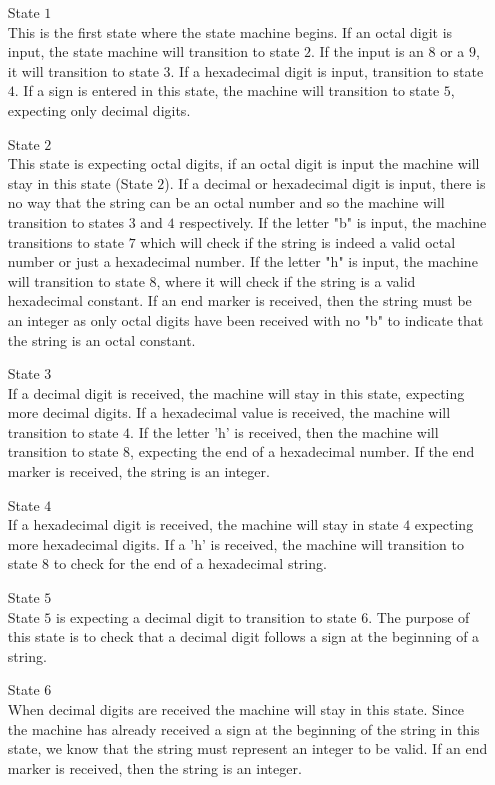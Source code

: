 \documentclass[11pt]{article}
\begin{document}
\begin{itemize}
\item[State $1$] \hfill \\
This is the first state where the state machine begins. If an octal digit is input, the state machine will transition to state $2$. If the input is an $8$ or a $9$, it will transition to state $3$. If a hexadecimal digit is input, transition to state $4$. If a sign is entered in this state, the machine will transition to state $5$, expecting only decimal digits.
\item[State $2$] \hfill \\
This state is expecting octal digits, if an octal digit is input the machine will stay in this state (State $2$).
 If a decimal or hexadecimal digit is input, there is no way that the string can be an octal number and so the machine will transition to states $3$ and $4$ respectively. 
 If the letter "b" is input, the machine transitions to state $7$ which will check if the string is indeed a valid octal number or just a hexadecimal number. 
 If the letter "h" is input, the machine will transition to state $8$, where it will check if the string is a valid hexadecimal constant. 
 If an end marker is received, then the string must be an integer as only octal digits have been received with no "b" to indicate that the string is an octal constant.
\item[State $3$] \hfill \\
If a decimal digit is received, the machine will stay in this state, expecting more decimal digits. If a hexadecimal value is received, the machine will transition to state $4$. If the letter 'h' is received, then the machine will transition to state $8$, expecting the end of a hexadecimal number. If the end marker is received, the string is an integer.
\item[State $4$] \hfill \\
If a hexadecimal digit is received, the machine will stay in state $4$ expecting more hexadecimal digits. If a 'h' is received, the machine will transition to state $8$ to check for the end of a hexadecimal string. 
\item[State $5$] \hfill \\
State $5$ is expecting a decimal digit to transition to state 6. The purpose of this state is to check that a decimal digit follows a sign at the beginning of a string.
\item[State $6$] \hfill \\
When decimal digits are received the machine will stay in this state. Since the machine has already received a sign at the beginning of the string in this state, we know that the string must represent an integer to be valid. If an end marker is received, then the string is an integer.

\end{itemize}
\end{document}
